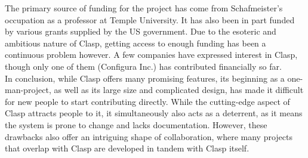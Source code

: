 The primary source of funding for the project has come from Schafmeister's occupation as a professor at Temple University. It has also been in part funded by various grants supplied by the US government\cite{clasp-grants}. Due to the esoteric and ambitious nature of Clasp, getting access to enough funding has been a continuous problem however. A few companies have expressed interest in Clasp, though only one of them (Configura Inc.) has contributed financially so far. \\

In conclusion, while Clasp offers many promising features, its beginning as a one-man-project, as well as its large size and complicated design, has made it difficult for new people to start contributing directly. While the cutting-edge aspect of Clasp attracts people to it, it simultaneously also acts as a deterrent, as it means the system is prone to change and lacks documentation. However, these drawbacks also offer an intriguing shape of collaboration, where many projects that overlap with Clasp are developed in tandem with Clasp itself.

